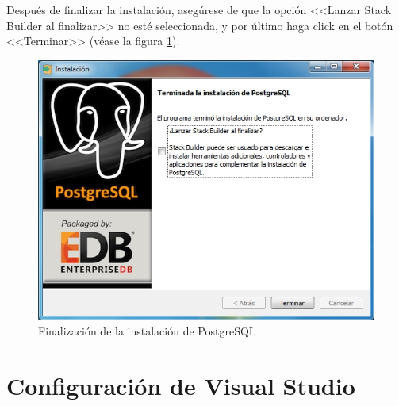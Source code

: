 Despu\'{e}s de finalizar la instalaci\'{o}n, aseg\'{u}rese de que la opci\'{o}n <<Lanzar Stack Builder al finalizar>> no est\'{e} seleccionada, y por \'{u}ltimo haga click en el bot\'{o}n <<Terminar>> (v\'{e}ase la figura \ref{fig:vs-instalacion9}).	
\vfill
\begin{figure}[H]
  \centering
  \includegraphics[width=.8\linewidth]{./img/postgres9.jpg}
\caption[]{Finalizaci\'{o}n de la instalaci\'{o}n de PostgreSQL\label{fig:vs-instalacion9}}
\end{figure}
\vfill
\newpage

\section*{Configuraci\'{o}n de Visual Studio}
	
